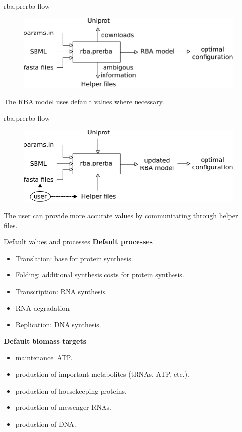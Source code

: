 \documentclass{beamer}
\begin{document}
\begin{frame}{rba.prerba flow}
  \begin{figure}[!ht]
    \centering
    \includegraphics[width=\linewidth]{prerba_summary}
  \end{figure}
  The RBA model uses default values where necessary.
\end{frame}

\begin{frame}{rba.prerba flow}
  \begin{figure}[!ht]
    \centering
    \includegraphics[width=\linewidth]{prerba_summary_2}
  \end{figure}
  The user can provide more accurate values by communicating through
  helper files.
\end{frame}

\begin{frame}{Default values and processes}
  \textbf{Default processes}
  \begin{itemize}
    \item Translation: base for protein synthesis.
    \item Folding: additional synthesis costs for protein synthesis.
    \item Transcription: RNA synthesis.
    \item RNA degradation.
    \item Replication: DNA synthesis.
  \end{itemize}
  \textbf{Default biomass targets}
  \begin{itemize}
    \item maintenance ATP.
    \item production of important metabolites (tRNAs, ATP, etc.).
    \item production of housekeeping proteins.
    \item production of messenger RNAs.
    \item production of DNA.
  \end{itemize}
\end{frame}
\end{document}
